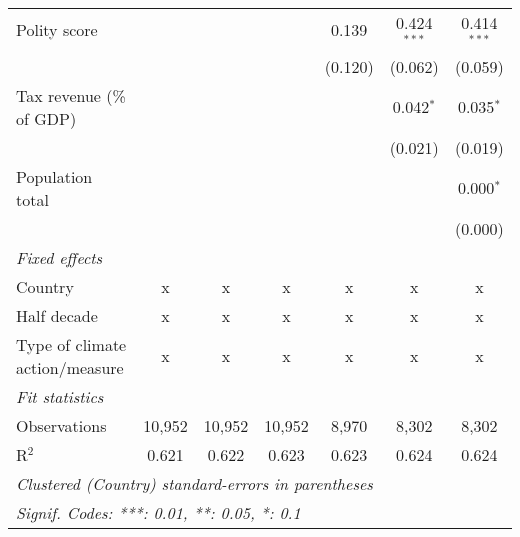 \begin{tabular}{lcccccc}
   Polity score                                                      &         &               &                & 0.139          & 0.424$^{***}$  & 0.414$^{***}$\\   
                                                                     &         &               &                & (0.120)        & (0.062)        & (0.059)\\   
   Tax revenue (\% of GDP)                                           &         &               &                &                & 0.042$^{*}$    & 0.035$^{*}$\\   
                                                                     &         &               &                &                & (0.021)        & (0.019)\\   
   Population total                                                  &         &               &                &                &                & 0.000$^{*}$\\   
                                                                     &         &               &                &                &                & (0.000)\\   
   \emph{Fixed effects}\\
   Country                                                           & x       & x             & x              & x              & x              & x\\  
   Half decade                                                       & x       & x             & x              & x              & x              & x\\  
   Type of climate action/measure                                    & x       & x             & x              & x              & x              & x\\  
   \midrule \emph{Fit statistics}\\
   Observations                                                      & 10,952  & 10,952        & 10,952         & 8,970          & 8,302          & 8,302\\  
   R$^2$                                                             & 0.621   & 0.622         & 0.623          & 0.623          & 0.624          & 0.624\\  
   \midrule
   \multicolumn{7}{l}{\emph{Clustered (Country) standard-errors in parentheses}}\\
   \multicolumn{7}{l}{\emph{Signif. Codes: ***: 0.01, **: 0.05, *: 0.1}}\\
\end{tabular}
\par\endgroup



